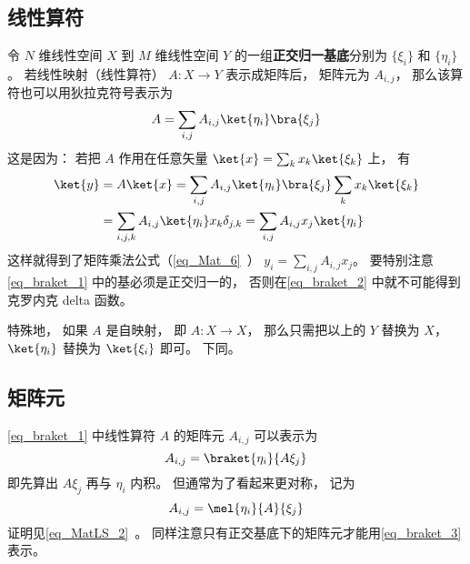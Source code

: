 \subsection{线性算符}
令 $N$ 维线性空间 $X$ 到 $M$ 维线性空间 $Y$ 的一组\textbf{正交归一基底}分别为 $\{\xi_i\}$ 和 $\{\eta_i\}$。 若线性映射（线性算符） $A:X\to Y$ 表示成矩阵后， 矩阵元为 $A_{i,j}$， 那么该算符也可以用狄拉克符号表示为
\begin{equation}\label{eq_braket_1}
A = \sum_{i,j} A_{i,j} \ket{\eta_i}\bra{\xi_j}
\end{equation}
这是因为： 若把 $A$ 作用在任意矢量 $\ket{x} = \sum_k x_k\ket{\xi_k}$ 上， 有
\begin{equation}\label{eq_braket_2}
\begin{aligned}
\ket{y} &= A\ket{x} = \sum_{i,j} A_{i,j} \ket{\eta_i}\bra{\xi_j} \sum_k x_k\ket{\xi_k}\\
&= \sum_{i,j, k} A_{i,j} \ket{\eta_i} x_k \delta_{j,k}
= \sum_{i,j} A_{i,j} x_j \ket{\eta_i}
\end{aligned}
\end{equation}
这样就得到了矩阵乘法公式（\autoref{eq_Mat_6}~） $y_i = \sum_{i,j} A_{i,j} x_j$。 要特别注意\autoref{eq_braket_1} 中的基必须是正交归一的， 否则在\autoref{eq_braket_2} 中就不可能得到克罗内克 delta 函数。

特殊地， 如果 $A$ 是自映射， 即 $A:X\to X$， 那么只需把以上的 $Y$ 替换为 $X$， $\ket{\eta_i}$ 替换为 $\ket{\xi_i}$ 即可。 下同。

\subsection{矩阵元}
\autoref{eq_braket_1} 中线性算符 $A$ 的矩阵元 $A_{i,j}$ 可以表示为
\begin{equation}
A_{i,j} = \braket{\eta_i}{A\xi_j}
\end{equation}
即先算出 $A\xi_j$ 再与 $\eta_i$ 内积。 但通常为了看起来更对称， 记为
\begin{equation}\label{eq_braket_3}
A_{i,j} = \mel{\eta_i}{A}{\xi_j}
\end{equation}
证明见\autoref{eq_MatLS_2}~。 同样注意只有正交基底下的矩阵元才能用\autoref{eq_braket_3} 表示。
